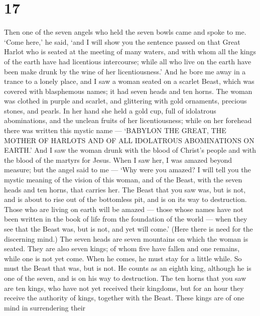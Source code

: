 \hypertarget{section-16}{%
\section{17}\label{section-16}}

 Then one of the seven angels who held the seven bowls came
and spoke to me. `Come here,' he said, `and I will show you the sentence
passed on that Great Harlot who is seated at the meeting of many waters,
 and with whom all the kings of the earth have had
licentious intercourse; while all who live on the earth have been make
drunk by the wine of her licentiousness.'  And he bore me
away in a trance to a lonely place, and I saw a woman seated on a
scarlet Beast, which was covered with blasphemous names; it had seven
heads and ten horns.  The woman was clothed in purple and
scarlet, and glittering with gold ornaments, precious stones, and
pearls. In her hand she held a gold cup, full of idolatrous
abominations, and the unclean fruits of her licentiousness; 
while on her forehead there was written this mystic name --- `BABYLON
THE GREAT, THE MOTHER OF HARLOTS AND OF ALL IDOLATROUS ABOMINATIONS ON
EARTH.'  And I saw the woman drunk with the blood of
Christ's people and with the blood of the martyrs for Jesus. When I saw
her, I was amazed beyond measure;  but the angel said to me
--- `Why were you amazed? I will tell you the mystic meaning of the
vision of this woman, and of the Beast, with the seven heads and ten
horns, that carries her.  The Beast that you saw was, but is
not, and is about to rise out of the bottomless pit, and is on its way
to destruction. Those who are living on earth will be amazed --- those
whose names have not been written in the book of life from the
foundation of the world --- when they see that the Beast was, but is
not, and yet will come.'  (Here there is need for the
discerning mind.) The seven heads are seven mountains on which the woman
is seated.  They are also seven kings; of whom five have
fallen and one remains, while one is not yet come. When he comes, he
must stay for a little while.  So must the Beast that was,
but is not. He counts as an eighth king, although he is one of the
seven, and is on his way to destruction.  The ten horns
that you saw are ten kings, who have not yet received their kingdoms,
but for an hour they receive the authority of kings, together with the
Beast.  These kings are of one mind in surrendering their

